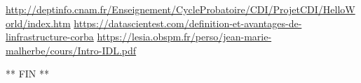 \begin{thebibliography}{10}
     \url{http://deptinfo.cnam.fr/Enseignement/CycleProbatoire/CDI/ProjetCDI/HelloWorld/index.htm} 
     \url{https://datascientest.com/definition-et-avantages-de-linfrastructure-corba}
     \url{https://lesia.obspm.fr/perso/jean-marie-malherbe/cours/Intro-IDL.pdf}
\end{thebibliography}

\vspace*{7cm}
\begin{center}
   \Huge{** FIN **}
\end{center}